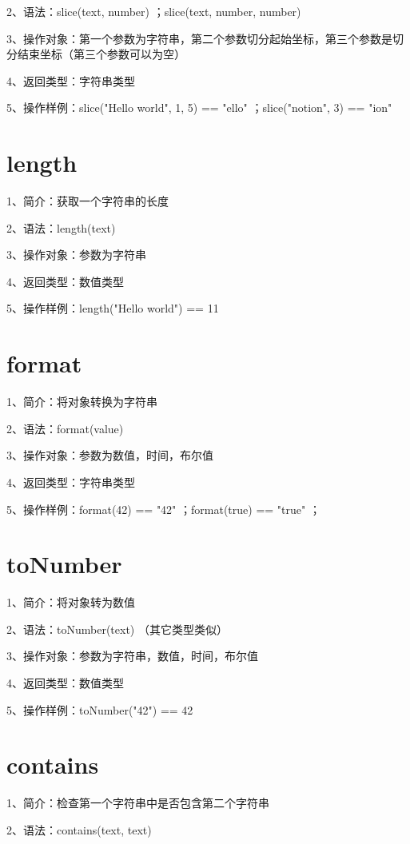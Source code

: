 2、语法：slice(text, number) ；slice(text, number, number)

3、操作对象：第一个参数为字符串，第二个参数切分起始坐标，第三个参数是切分结束坐标（第三个参数可以为空）

4、返回类型：字符串类型

5、操作样例：slice("Hello world", 1, 5) == "ello" ；slice("notion", 3) == "ion"

\section{length}

1、简介：获取一个字符串的长度

2、语法：length(text)

3、操作对象：参数为字符串

4、返回类型：数值类型

5、操作样例：length("Hello world") == 11

\section{format}

1、简介：将对象转换为字符串

2、语法：format(value)

3、操作对象：参数为数值，时间，布尔值

4、返回类型：字符串类型

5、操作样例：format(42) == "42" ；format(true) == "true" ；

\section{toNumber}

1、简介：将对象转为数值

2、语法：toNumber(text) （其它类型类似）

3、操作对象：参数为字符串，数值，时间，布尔值

4、返回类型：数值类型

5、操作样例：toNumber("42") == 42

\section{contains}

1、简介：检查第一个字符串中是否包含第二个字符串

2、语法：contains(text, text)

